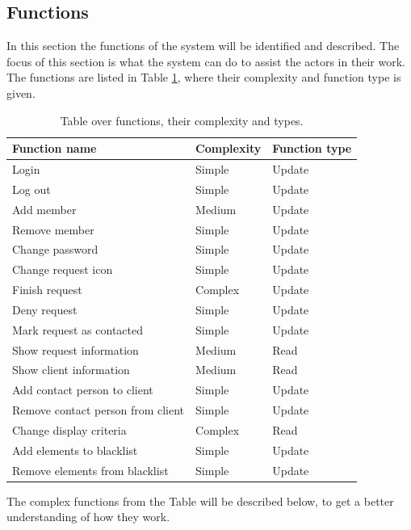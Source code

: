 \subsection{Functions}
In this section the functions of the system will be identified and described. The focus of this section is what the system can do to assist the actors in their work. The functions are listed in Table \ref{tab:functionTable}, where their complexity and function type is given.
\begin{table}[H]
\begin{tabular}{|l|l|l|}
\hline
\textbf{Function name}  & \textbf{Complexity} & \textbf{Function type} \\ \hline
Login                             & Simple     & Update        \\ \hline
Log out                           & Simple     & Update        \\ \hline
Add member                        & Medium     & Update        \\ \hline
Remove member                     & Simple     & Update        \\ \hline
Change password                   & Simple     & Update        \\ \hline
Change request icon               & Simple     & Update        \\ \hline
Finish request                    & Complex    & Update        \\ \hline
Deny request                      & Simple     & Update        \\ \hline
Mark request as contacted         & Simple     & Update        \\ \hline
Show request information          & Medium     & Read          \\ \hline
Show client information           & Medium     & Read          \\ \hline
Add contact person to client      & Simple     & Update        \\ \hline
Remove contact person from client & Simple     & Update        \\ \hline
Change display criteria           & Complex    & Read          \\ \hline
Add elements to blacklist         & Simple     & Update        \\ \hline
Remove elements from blacklist    & Simple     & Update        \\ \hline
\end{tabular}
\caption{Table over functions, their complexity and types.}
\label{tab:functionTable}
\end{table}
\noindent
The complex functions from the Table will be described below, to get a better understanding of how they work. 

